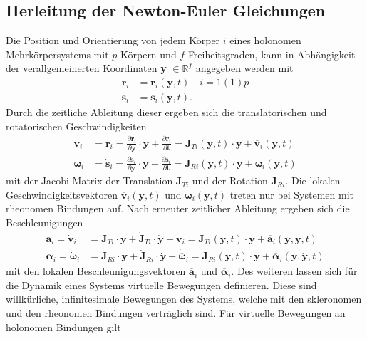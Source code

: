 \subsection{Herleitung der Newton-Euler Gleichungen}
Die Position und Orientierung von jedem Körper $i$ eines holonomen Mehrkörpersystems mit $p$ Körpern und $f$ Freiheitsgraden, kann in Abhängigkeit der verallgemeinerten Koordinaten \textbf{y} $\in \mathbb{R}^f$ angegeben werden mit
\begin{align}
\pmb{r}_i &= \pmb{r}_i(\pmb{y},t)\quad i = 1(1)p\\
\pmb{s}_i &= \pmb{s}_i(\pmb{y},t).
\end{align}
Durch die zeitliche Ableitung dieser ergeben sich die translatorischen und rotatorischen Geschwindigkeiten
\begin{align}\label{vi}
\pmb{v}_i &=  \dot{\pmb{r}}_i = \frac{\partial\pmb{r}_i}{\partial\pmb{y}}\cdot \dot{\pmb{y}} + \frac{\partial\pmb{r}_i}{\partial\pmb{t}} = \pmb{J}_{Ti}(\pmb{y},t)\cdot \dot{\pmb{y}} + \overline{\pmb{v}}_i(\pmb{y},t)\\
\pmb{\omega}_i &=  \dot{\pmb{s}}_i = \frac{\partial\pmb{s}_i}{\partial\pmb{y}}\cdot \dot{\pmb{y}} + \frac{\partial\pmb{s}_i}{\partial\pmb{t}} = \pmb{J}_{Ri}(\pmb{y},t)\cdot \dot{\pmb{y}} + \overline{\pmb{\omega}}_i(\pmb{y},t)
\end{align}
mit der Jacobi-Matrix der Translation $\pmb{J}_{Ti}$ und der Rotation $\pmb{J}_{Ri}$. Die lokalen Geschwindigkeitsvektoren $\overline{\pmb{v}}_i(\pmb{y},t)$ und $\overline{\pmb{\omega}}_i(\pmb{y},t)$ treten nur bei Systemen mit rheonomen Bindungen auf. Nach erneuter zeitlicher Ableitung ergeben sich die Beschleunigungen 
\begin{align}
\pmb{a}_i = \dot{\pmb{v}}_i &= \pmb{J}_{Ti} \cdot \ddot{\pmb{y}} + \dot{\pmb{J}}_{Ti} \cdot \dot{\pmb{y}} + \dot{\overline{\pmb{v}}}_i = \pmb{J}_{Ti}(\pmb{y},t) \cdot \ddot{\pmb{y}} + \overline{\pmb{a}}_i(\pmb{y},\dot{\pmb{y}},t)\\
\pmb{\alpha}_i = \dot{\pmb{\omega}}_i &= \pmb{J}_{Ri} \cdot \ddot{\pmb{y}} + \dot{\pmb{J}}_{Ri} \cdot \dot{\pmb{y}} + \dot{\overline{\pmb{\omega}}}_i = \pmb{J}_{Ri}(\pmb{y},t) \cdot \ddot{\pmb{y}} + \overline{\pmb{\alpha}}_i(\pmb{y},\dot{\pmb{y}},t)\label{alphai}
\end{align}
mit den lokalen Beschleunigungsvektoren $\overline{\pmb{a}}_i$ und $ \overline{\pmb{\alpha}}_i$. 
Des weiteren lassen sich für die Dynamik eines Systems virtuelle Bewegungen definieren. Diese sind willkürliche, infinitesimale Bewegungen des Systems, welche mit den skleronomen und den rheonomen Bindungen verträglich sind. Für virtuelle Bewegungen an holonomen Bindungen gilt
